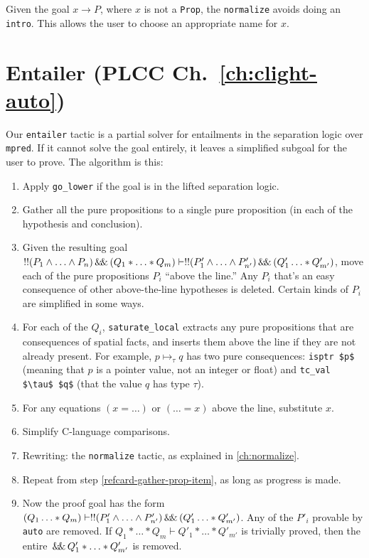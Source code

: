 \documentclass[12pt,fleqn,openany,oneside,showtrims]{memoir}
\newcommand{\ychapter}[2]{\chapter[#1]{#1 \hfill \normalsize #2}}
\begin{document}
Given the goal $x \rightarrow P$, where $x$ is not
a \lstinline{Prop}, the \lstinline{normalize} avoids
doing an \lstinline{intro}.  This allows the user
to choose an appropriate name for $x$.

\ychapter{Entailer}{(PLCC Ch.~\ref{ch:clight-auto})}
\label{refcard:entailer}
Our \lstinline{entailer} tactic is a partial solver
for entailments in the separation logic over \lstinline{mpred}.
If it cannot solve the goal entirely, it leaves a simplified
subgoal for the user to prove.  The algorithm is this:
\begin{enumerate}
\item Apply \lstinline{go_lower} if the goal is in the lifted
separation logic.
\item Gather all the pure propositions to a single pure proposition
\label{refcard-gather-prop-item}
(in each of the hypothesis and conclusion).
\item Given the resulting goal $!! (P_1 \wedge \ldots \wedge P_n) \,\mathsf{\&\hspace{-.2em}\&}\, (Q_1*\ldots*Q_m) \vdash !! (P'_1 \wedge \ldots \wedge P'_{n'}) \,\mathsf{\&\hspace{-.2em}\&}\, (Q'_1\ldots*Q'_{m'})$,
move each of the pure propositions $P_i$ ``above the line.''  Any $P_i$ that's
an easy consequence of other above-the-line hypotheses is deleted.
Certain kinds of $P_i$ are simplified in some ways.
\item For each of the $Q_i$, \lstinline{saturate_local} extracts any
pure propositions that are consequences of spatial facts, and inserts
them above the line if they  are not already present.  For example,
$p \mapsto_\tau q$ has two pure consequences: \lstinline{isptr $p$}
(meaning that $p$ is a pointer value, not an integer or float)
and \lstinline{tc_val $\tau$ $q$} (that the value $q$ has type $\tau$).
\item For any equations $(x=\ldots)$ or $(\ldots=x)$ above the line,
substitute $x$.
\item Simplify C-language comparisons.
\item Rewriting: the \lstinline{normalize}
tactic, as explained in \autoref{ch:normalize}.
\item Repeat from step \ref{refcard-gather-prop-item}, as long as progress is made.
\item Now the proof goal has the form
$(Q_1\ldots*Q_m) \vdash !! (P'_1 \wedge \ldots \wedge P'_{n'}) \,\mathsf{\&\hspace{-.2em}\&}\, (Q'_1\ldots*Q'_{m'})$.
Any of the $P'_i$ provable by \lstinline{auto} are removed.
If $Q_1*\ldots*Q_m \vdash Q'_1*\ldots*Q'_{m'}$ is trivially
proved, then the entire $\,\mathsf{\&\hspace{-.2em}\&}\, Q'_1*\ldots*Q'_{m'}$ is removed.
\end{enumerate}
\end{document}
